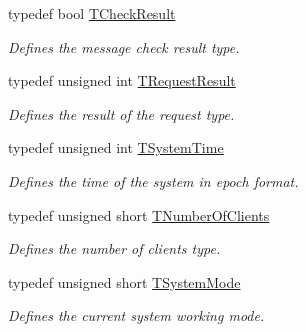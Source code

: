 \begin{DoxyCompactItemize}
typedef bool \hyperlink{class_terra_swarm_1_1_asynchronous_1_1_client_connection_response_aee00184a039b2aebfcefd9d5b5b71c89}{T\-Check\-Result}
\begin{DoxyCompactList}\small\item\em Defines the message check result type. \end{DoxyCompactList}\item 
typedef unsigned int \hyperlink{class_terra_swarm_1_1_asynchronous_1_1_client_connection_response_a55a4d4527b877bde0e74da223157a62a}{T\-Request\-Result}
\begin{DoxyCompactList}\small\item\em Defines the result of the request type. \end{DoxyCompactList}\item 
typedef unsigned int \hyperlink{class_terra_swarm_1_1_asynchronous_1_1_client_connection_response_ac32ae5e652874b024aae5ed2f816c155}{T\-System\-Time}
\begin{DoxyCompactList}\small\item\em Defines the time of the system in epoch format. \end{DoxyCompactList}\item 
typedef unsigned short \hyperlink{class_terra_swarm_1_1_asynchronous_1_1_client_connection_response_a0780de58d62395a3cce207fe96e43ccc}{T\-Number\-Of\-Clients}
\begin{DoxyCompactList}\small\item\em Defines the number of clients type. \end{DoxyCompactList}\item 
typedef unsigned short \hyperlink{class_terra_swarm_1_1_asynchronous_1_1_client_connection_response_ac34facba96c97e6897a1abd5ddd09159}{T\-System\-Mode}
\begin{DoxyCompactList}\small\item\em Defines the current system working mode. \end{DoxyCompactList}\end{DoxyCompactItemize}
